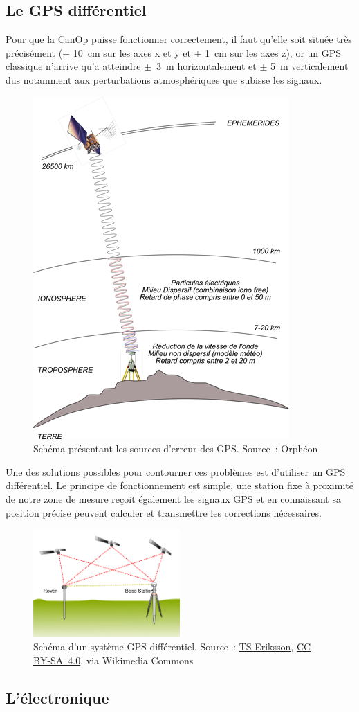 \subsection{Le GPS différentiel}
\label{ssec_Gps_differenciel}
Pour que la CanOp puisse fonctionner correctement, il faut qu'elle soit située très précisément ($\pm$ 10~cm sur les axes x et y et $\pm$ 1~cm sur les axes z), or un GPS classique n'arrive qu’a atteindre $\pm$~3~m horizontalement et $\pm$ 5~m verticalement dus notamment aux perturbations atmosphériques que subisse les signaux. 
\begin{figure}
    \centering
    \includegraphics[height=0.5\textwidth]{img/she/GPS-mode-Naturel-5-10m.png}
    \caption[Source d'erreur des GPS]{Schéma présentant les sources d'erreur des GPS. Source~: Orphéon}
    \label{fig_GPS_error_source}
\end{figure}

Une des solutions possibles pour contourner ces problèmes est d'utiliser un GPS différentiel. Le principe de fonctionnement est simple, une station fixe à proximité de notre zone de mesure reçoit également les signaux GPS et en connaissant sa position précise peuvent calculer et transmettre les corrections nécessaires. \cite{site:GPS_diff}
\begin{figure}
    \centering
    \includegraphics[width=0.5\textwidth]{img/she/Real_time_kinematic.png}
    \caption[Shema d'un systeme GPS differenciel]{Schéma d'un système GPS différentiel. Source~: \href{https://commons.wikimedia.org/wiki/File:Real_time_kinematic.svg}{TS Eriksson}, \href{https://creativecommons.org/licenses/by-sa/4.0}{CC BY-SA~4.0}, via Wikimedia Commons}
    \label{fig_RTK}
\end{figure}

\subsection{L'électronique}

    
